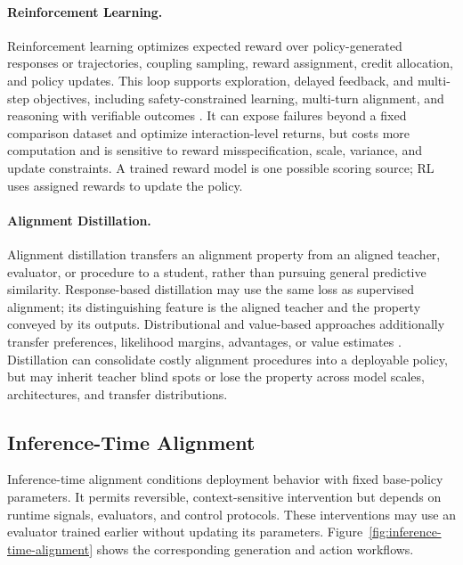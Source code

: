 \documentclass[11pt]{article}
\begin{document}
\paragraph{Reinforcement Learning.}
Reinforcement learning optimizes expected reward over policy-generated responses or trajectories, coupling sampling, reward assignment, credit allocation, and policy updates. This loop supports exploration, delayed feedback, and multi-step objectives, including safety-constrained learning, multi-turn alignment, and reasoning with verifiable outcomes \citep{dai2024saferlhf,shani2024multiturn,deepseek2025r1}. It can expose failures beyond a fixed comparison dataset and optimize interaction-level returns, but costs more computation and is sensitive to reward misspecification, scale, variance, and update constraints. A trained reward model is one possible scoring source; RL uses assigned rewards to update the policy.

\paragraph{Alignment Distillation.}
Alignment distillation transfers an alignment property from an aligned teacher, evaluator, or procedure to a student, rather than pursuing general predictive similarity. Response-based distillation may use the same loss as supervised alignment; its distinguishing feature is the aligned teacher and the property conveyed by its outputs. Distributional and value-based approaches additionally transfer preferences, likelihood margins, advantages, or value estimates \citep{gao2025adpa,gu2025pad,kwon2025tvkd,nguyen2026ctpd}. Distillation can consolidate costly alignment procedures into a deployable policy, but may inherit teacher blind spots or lose the property across model scales, architectures, and transfer distributions.

\subsection{Inference-Time Alignment}
\label{subsec:inference-time-alignment}

Inference-time alignment conditions deployment behavior with fixed base-policy parameters. It permits reversible, context-sensitive intervention but depends on runtime signals, evaluators, and control protocols. These interventions may use an evaluator trained earlier without updating its parameters. Figure~\ref{fig:inference-time-alignment} shows the corresponding generation and action workflows.
\end{document}
